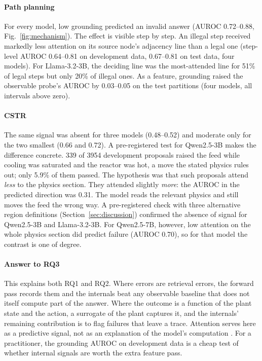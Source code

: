 \paragraph{Path planning} For every model, low grounding predicted an invalid answer (AUROC 0.72--0.88,
Fig.~\ref{fig:mechanism}). The effect is visible step by step. An illegal step received markedly less attention
on its source node's adjacency line than a legal one (step-level AUROC 0.64--0.81 on development data, 0.67--0.81
on test data, four models). For Llama-3.2-3B, the deciding line was the most-attended line for 51\% of legal steps
but only 20\% of illegal ones. As a feature, grounding raised the observable probe's AUROC by 0.03--0.05 on the
test partitions (four models, all intervals above zero).

\paragraph{CSTR} The same signal was absent for three models (0.48--0.52) and moderate only for the two smallest
(0.66 and 0.72). A pre-registered test for Qwen2.5-3B makes the difference concrete. 339 of 3954 development
proposals raised the feed while cooling was saturated and the reactor was hot, a move the stated physics rules
out; only 5.9\% of them passed. The hypothesis was that such proposals attend \emph{less} to the physics section.
They attended slightly \emph{more}: the AUROC in the predicted direction was 0.31. The model reads the relevant
physics and still moves the feed the wrong way. A pre-registered check with three alternative region definitions
(Section~\ref{sec:discussion}) confirmed the absence of signal for Qwen2.5-3B and Llama-3.2-3B. For Qwen2.5-7B,
however, low attention on the whole physics section did predict failure (AUROC 0.70), so for that model the
contrast is one of degree.

\paragraph{Answer to RQ3} This explains both RQ1 and RQ2. Where errors are retrieval errors, the forward pass
records them and the internals beat any observable baseline that does not itself compute part of the answer.
Where the outcome is a function of the plant state and the action, a surrogate of the plant captures it, and the
internals' remaining contribution is to flag failures that leave a trace. Attention serves here as a predictive
signal, not as an explanation of the model's computation \citep{jain2019attention,wiegreffe2019attention}. For a
practitioner, the grounding AUROC on development data is a cheap test of whether internal signals are worth the
extra feature pass.

